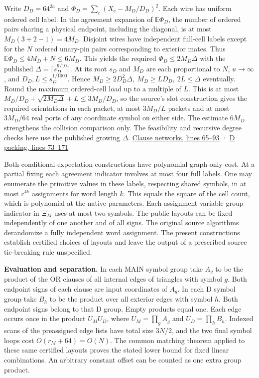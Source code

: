 \documentclass[
  11pt,
]{article}
\begin{document}
Write \(D_D=64^{2a}\) and \(\Phi_D=\sum_c(X_c-M_D/D_D)^2\). Each wire
has uniform ordered cell label. In the agreement expansion of
\(\mathbb E\Phi_D\), the number of ordered pairs sharing a physical
endpoint, including the diagonal, is at most \(M_D(3+2-1)=4M_D\).
Disjoint wires have independent full-cell labels except for the \(N\)
ordered unary-pin pairs corresponding to exterior mates. Thus
\(\mathbb E\Phi_D\le4M_D+N\le6M_D\). This yields the required
\(\Phi_D\le2M_D\Delta\) with the published
\(\Delta=\lceil s_D^{9/10}\rceil\). At its root \(s_D\) and \(M_D\) are
each proportional to \(N\), \(u\to\infty\), and
\(D_D,L\le s_D^{1/1000}\). Hence
\(M_D\ge2D_D^2\Delta,\ M_D\ge LD_D,\ 2L\le\Delta\) eventually. Round the
maximum ordered-cell load up to a multiple of \(L\). This is at most
\(M_D/D_D+\sqrt{2M_D\Delta}+L\le3M_D/D_D\), so the source's slot
construction gives the required orientations in each packet, at most
\(3M_D/L\) packets and at most \(3M_D/64\) real ports of any coordinate
symbol on either side. The estimate \(6M_D\) strengthens the collision
comparison only. The feasibility and recursive degree checks here use
the published growing \(\Delta\).
\href{https://github.com/openai/math/blob/main/preprints/The-Exponential-Time-Hypothesis-is-False-October-25-2026/build/quantitative-reduction.tex\#L65-L93}{Clause
networks, lines 65--93} ·
\href{https://github.com/openai/math/blob/main/preprints/The-Exponential-Time-Hypothesis-is-False-October-25-2026/build/quantitative-contraction.tex\#L73-L171}{D
packing, lines 73--171}

Both conditional-expectation constructions have polynomial graph-only
cost. At a partial fixing each agreement indicator involves at most four
full labels. One may enumerate the primitive values in these labels,
respecting shared symbols, in at most \(r^{4k}\) assignments for word
length \(k\). This equals the square of the cell count, which is
polynomial at the native parameters. Each assignment-variable group
indicator in \(\Xi_M\) uses at most two symbols. The public layouts can
be fixed independently of one another and of all signs. The original
source algorithms derandomize a fully independent word assignment. The
present constructions establish certified choices of layouts and leave
the output of a prescribed source tie-breaking rule unspecified.

\textbf{Evaluation and separation.} In each MAIN symbol group take
\(A_g\) to be the product of the OR clauses of all internal edges of
triangles with symbol \(g\). Both endpoint signs of each clause are
input coordinates of \(A_g\). In each D symbol group take \(B_h\) to be
the product over all exterior edges with symbol \(h\). Both endpoint
signs belong to that D group. Empty products equal one. Each edge occurs
once in the product \(U_MU_D\), where \(U_M=\prod_g A_g\) and
\(U_D=\prod_h B_h\). Indexed scans of the preassigned edge lists have
total size \(3N/2\), and the two final symbol loops cost
\(O(r_M+64)=O(N)\). The common matching theorem applied to these same
certified layouts proves the stated lower bound for fixed linear
combinations. An arbitrary constant offset can be counted as one extra
group product.
\end{document}
